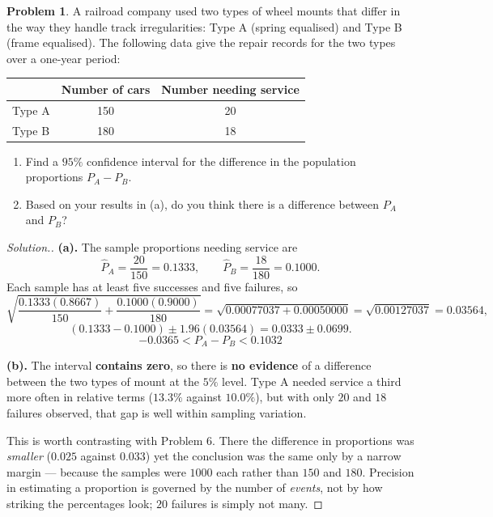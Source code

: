 \documentclass[11pt,a4paper]{article}
\theoremstyle{definition}
\newtheorem{problemx}{Problem}[section]
\newenvironment{problem}{\begin{problemx}}{\end{problemx}}
\newenvironment{solution}
  {\renewcommand{\qedsymbol}{}\begin{proof}[\textit{Solution}.]}
  {\end{proof}}
\begin{document}
\begin{problem}
A railroad company used two types of wheel mounts that differ in the way they handle track
irregularities: Type A (spring equalised) and Type B (frame equalised). The following data
give the repair records for the two types over a one-year period:
\begin{table}[H]
\centering
\begin{tabular}{lcc}
& Number of cars & Number needing service\\
\hline
Type A & 150 & 20\\
Type B & 180 & 18\\
\end{tabular}
\end{table}
\begin{enumerate}
\item[(a).] Find a $95\%$ confidence interval for the difference in the population
proportions $P_A-P_B$.
\item[(b).] Based on your results in (a), do you think there is a difference between $P_A$
and $P_B$?
\end{enumerate}
\end{problem}

\begin{solution}
\textbf{(a).} The sample proportions needing service are
\[\hat{P}_A=\frac{20}{150}=0.1333,\qquad \hat{P}_B=\frac{18}{180}=0.1000.\]
Each sample has at least five successes and five failures, so
\[\sqrt{\frac{0.1333(0.8667)}{150}+\frac{0.1000(0.9000)}{180}}
=\sqrt{0.00077037+0.00050000}=\sqrt{0.00127037}=0.03564,\]
\[(0.1333-0.1000)\pm 1.96(0.03564)=0.0333\pm 0.0699.\]
\[-0.0365<P_A-P_B<0.1032\]

\textbf{(b).} The interval \textbf{contains zero}, so there is \textbf{no evidence} of a
difference between the two types of mount at the $5\%$ level. Type A needed service a third
more often in relative terms ($13.3\%$ against $10.0\%$), but with only $20$ and $18$
failures observed, that gap is well within sampling variation.

This is worth contrasting with Problem 6. There the difference in proportions was
\emph{smaller} ($0.025$ against $0.033$) yet the conclusion was the same only by a narrow
margin --- because the samples were $1000$ each rather than $150$ and $180$. Precision in
estimating a proportion is governed by the number of \emph{events}, not by how striking the
percentages look; $20$ failures is simply not many.
\end{solution}
\end{document}
